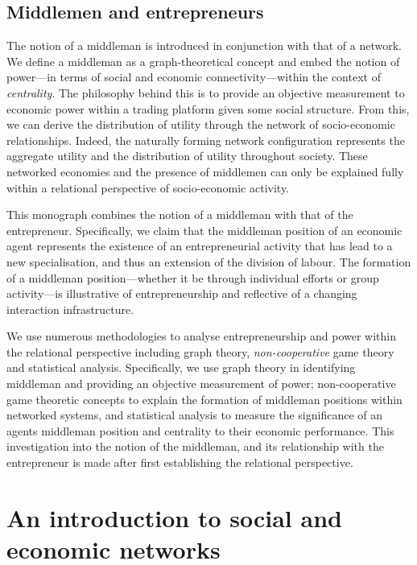 \subsection{Middlemen and entrepreneurs}

The notion of a middleman is introduced in conjunction with that of a network. We define a middleman as a graph-theoretical concept and embed the notion of power---in terms of social and economic connectivity---within the context of \emph{centrality}. The philosophy behind this is to provide an objective measurement to economic power within a trading platform given some social structure. From this, we can derive the distribution of utility through the network of socio-economic relationships. Indeed, the naturally forming network configuration represents the aggregate utility and the distribution of utility throughout society. These networked economies and the presence of middlemen can only be explained fully within a relational perspective of socio-economic activity.

This monograph combines the notion of a middleman with that of the entrepreneur. Specifically, we claim that the middleman position of an economic agent represents the existence of an entrepreneurial activity that has lead to a new specialisation, and thus an extension of the division of labour. The formation of a middleman position---whether it be through individual efforts or group activity---is illustrative of entrepreneurship and reflective of a changing interaction infrastructure.

We use numerous methodologies to analyse entrepreneurship and power within the relational perspective including graph theory, \emph{non-cooperative} game theory and statistical analysis. Specifically, we use graph theory in identifying middleman and providing an objective measurement of power; non-cooperative game theoretic concepts to explain the formation of middleman positions within networked systems, and statistical analysis to measure the significance of an agents middleman position and centrality to their economic performance. This investigation into the notion of the middleman, and its relationship with the entrepreneur is made after first establishing the relational perspective.

\section{An introduction to social and economic networks}
\label{sec:socialeconomicnetworks}

